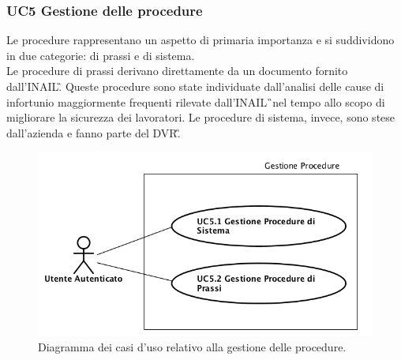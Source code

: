 	\subsubsection{UC5 Gestione delle procedure}
		\label{section:UC5}
		Le procedure rappresentano un aspetto di primaria importanza e si suddividono in due categorie: di prassi e di sistema. \\
		Le procedure di prassi derivano direttamente da un documento fornito dall'\gls{INAIL}\G. Queste procedure sono state individuate dall'analisi delle cause di infortunio maggiormente frequenti rilevate dall'\gls{INAIL}\G\ nel tempo allo scopo di migliorare la sicurezza dei lavoratori.
		Le procedure di sistema, invece, sono stese dall'azienda e fanno parte del \gls{DVR}\G. 
		\begin{figure}[H]
			\begin{center}
				\includegraphics[width=12cm]{Pics/UC5GestioneProcedure.png}
				\caption{Diagramma dei casi d'uso relativo alla gestione delle procedure.}
				\label{fig:UC5_Procedure}
			\end{center}
		\end{figure}
		
